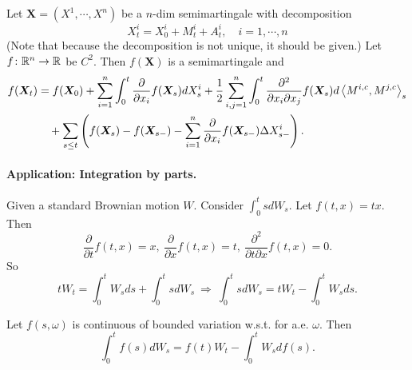 \begin{thm}[It\^o Formula]
    Let $\bm{X} = (X^1,\cdots,X^n)$ be a $n$-dim semimartingale with decomposition
    \begin{equation*}
        X_t^i = X_0^i + M_t^i + A_t^i,\quad i = 1,\cdots,n
    \end{equation*}
    (Note that because the decomposition is not unique, it should be given.) Let $f \colon \mathbb{R}^n \rightarrow \mathbb{R}$ be $C^2$. Then $f(\bm{X})$ is a semimartingale and
    \begin{align*}
        f(\bm{X}_t) &= f(\bm{X}_0) + \sum_{i=1}^n \int_0^t \frac{\partial}{\partial x_i} f(\bm{X}_s)dX_s^i +  \frac{1}{2}\sum_{i,j=1}^n\int_0^t \frac{\partial^2}{\partial x_i \partial x_j}f(\bm{X}_s)d\left\langle M^{i,c},M^{j,c} \right\rangle_s \\
        &\quad + \sum_{s \leq t}\left(f(\bm{X}_s) - f(\bm{X}_{s-}) - \sum_{i=1}^n \frac{\partial}{\partial x_i}f(\bm{X}_{s-}) \Delta X^i_{s-} \right).
    \end{align*}
\end{thm}

\paragraph{Application: Integration by parts.} 

\begin{exam}
    Given a standard Brownian motion $W$. Consider $\int_0^t s dW_s$. Let $f(t,x) = tx$. Then
    \begin{equation*}
        \frac{\partial}{\partial t}f(t,x) = x,~\frac{\partial}{\partial x}f(t,x) =t,~\frac{\partial^2}{\partial t \partial x}f(t,x) = 0.
    \end{equation*}
    So
    \begin{equation*}
        tW_t = \int_0^tW_s ds + \int_0^t s dW_s~\Rightarrow~\int_0^t s dW_s = tW_t - \int_0^tW_s ds.
    \end{equation*}
\end{exam}

\begin{thm}
    Let $f(s,\omega)$ is continuous of bounded variation w.s.t. for a.e. $\omega$. Then
    \begin{equation*}
        \int_0^t f(s)dW_s = f(t)W_t - \int_0^t W_s df(s).
    \end{equation*}
\end{thm}

